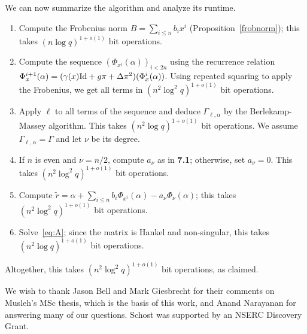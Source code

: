 \documentclass[sigconf]{acmart}
\begin{document}
\smallskip{} We can now summarize the algorithm and
analyze its runtime.
\begin{enumerate}
\item Compute the Frobenius norm $B=\sum_{i \le n} b_i x^i$ (Proposition~\ref{frobnorm});
this takes $(n \log q)^{1+o(1)}$ bit operations.
\item Compute the sequence $(\Phi_{x^{i}}(\alpha))_{i < 2n}$ using the
  recurrence relation $\Phi_x^{i+1}(\alpha) = (\gamma(x) {\rm Id} +
  g\pi + \Delta \pi^2)(\Phi_x^i(\alpha))$. Using repeated squaring to
  apply the Frobenius, we get all terms in $(n^2 \log^2 q)^{1+o(1)}$ bit
  operations.
\item Apply $\ell$ to all terms of the sequence and deduce
  $\Gamma_{\ell,\alpha}$ by the Berlekamp-Massey algorithm. This takes
  $(n^2 \log q)^{1+o(1)}$ bit operations. We assume
  $\Gamma_{\ell,\alpha}=\Gamma$ and let $\nu$ be its degree.
\item If $n$ is even and $\nu=n/2$, compute $a_\nu$ as in {\bf 7.1};
  otherwise, set $a_\nu=0$. This takes $(n^2 \log^2 q)^{1+o(1)}$ bit
  operations.
\item Compute $\tilde r = \alpha + \sum_{i \le n} b_i
  \Phi_{x^{i}}(\alpha) - a_\nu \Phi_\nu(\alpha)$; this takes $(n^2
  \log^2 q)^{1+o(1)}$ bit operations.
\item Solve~\eqref{eq:A}; since the matrix is Hankel and non-singular,
  this takes $(n^2 \log q)^{1+o(1)}$ bit operations.
\end{enumerate}
Altogether, this takes  $(n^2 \log^2 q)^{1+o(1)}$ bit operations,
as claimed.


\begin{acks}
  We wish to thank Jason Bell and Mark Giesbrecht for their comments
  on Musleh's MSc thesis, which is the basis of this work, and Anand
  Narayanan for answering many of our questions. Schost was supported
  by an NSERC Discovery Grant.
\end{acks}





\end{document}
